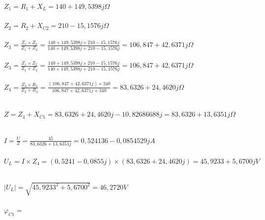 \documentclass[12pt,a4paper,titlepage,final]{article}
\begin{document}
	\begin{tabbing}
		$ Z_{1} = R_{1} + X_{L} = 140 + 149,5398j \Omega $ \\
		\\
		$ Z_{2} = R_{2} + X_{C2} = 210 -15,1576j \Omega $ \\
		\\
		${ \displaystyle Z_{3} =
		\frac{ Z_{1} \times Z_{2} }{ Z_{1} + Z_{2} } =
		\frac{ 140 + 149,5398j \times 210 -15,1576j }
		     { 140 + 149,5398j + 210 -15,1576j } =
		     106,847 + 42,6371j \Omega }$\\
		\\
		${ \displaystyle Z_{3} =
		\frac{ Z_{1} \times Z_{2} }{ Z_{1} + Z_{2} } =
		\frac{ 140 + 149,5398j \times 210 -15,1576j }
		     { 140 + 149,5398j + 210 -15,1576j } =
		     106,847 + 42,6371j \Omega }$\\
		\\
		${ \displaystyle Z_{4} =
		\frac{ Z_{3} \times R_{3} }{ Z_{3} + R_{3} } =
		\frac{ (106,847 + 42,6371j) \times 340 }{ 106,847 + 42,6371j + 340 } =
		83,6326 + 24,4620j \Omega }$\\
		\\
	\end{tabbing}
	
	\begin{tabbing}
		$Z = Z_{4} + X_{C1} = 83,6326 + 24,4620j - 10,82686688j =
		83,6326 + 13,6351j \Omega $ \\
		\\
	\end{tabbing}
	
	\begin{tabbing}
		${ \displaystyle I = \frac{U}{Z} =
		\frac{45}{83,6326 + 13,6351j} = 0,524136 - 0,0854529j A }$ \\
		\\
		$U_{L} = I \times Z_{4} = 
		(0,5241 - 0,0855j) \times (83,6326 + 24,4620j) = 
		45,9233 + 5,6700j V$ \\
		\\
	\end{tabbing}
	
	\begin{tabbing}
		$|U_{L}| = \sqrt{45,9233^{2} + 5,6700^{2}} = 46,2720 V$\\
		\\
		$\varphi_{C1} = $
	\end{tabbing}

	\newpage
	
\end{document}
